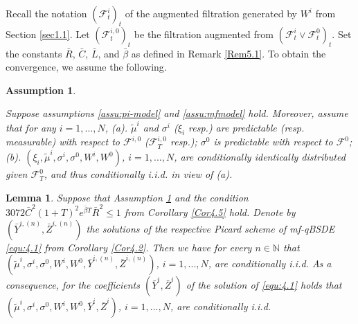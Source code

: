 \documentclass[10pt,a4paper]{article}
\newcommand{\MF}{{\mathcal{F}}}
\newcommand{\bL}{\bar{L}}
\newcommand{\bC}{\bar{C}}
\newcommand{\bR}{\bar{R}}
\theoremstyle{plain}
\newtheorem{Lemma}[Theorem]{Lemma}
\newtheorem{Assumption}[Theorem]{Assumption}
\theoremstyle{definition}
\numberwithin{equation}{section}
\begin{document}
 


Recall the notation $(\MF^i_t)_t$ of the augmented filtration generated by $W^i$ from Section \ref{sec1.1}. Let $(\MF^{i,0}_t)_t$ be the filtration augmented from $(\MF^i_t \vee \MF^0_t)_t$. Set the constants $\bR$, $\bC$, $\bL$, and $\bar\beta$ as defined in Remark \ref{Rem5.1}. To obtain the convergence, we assume the following.

\begin{Assumption}\label{assu:convergmf}

Suppose assumptions \ref{assu:pi-model} and \ref{assu:mfmodel} hold. Moreover, assume that for any $i=1,...,N$, 
(a). $\tilde \mu^i$ and $\sigma^i$ ($\xi_i $ resp.) are predictable (resp. measurable) with respect to $\MF^{i,0}$ ($\MF^{i,0}_T$ resp.); $\sigma^0$ is predictable with respect to $\MF^{0}$; \\
(b). $(\xi_i, \tilde \mu^i, \sigma^i, \sigma^0, W^i, W^0)$, $i=1,...,N$, are conditionally identically distributed given $\mathcal{F}_{T}^{0}$, and thus conditionally i.i.d. in view of (a).

\end{Assumption}


\begin{Lemma}\label{lem:ciid}
 Suppose that Assumption \ref{assu:convergmf} and the condition $
3072 \bC^{2}(1+T)^{2}e^{\bar{\beta} T} \bR^{2} \leq 1
$ from  Corollary \ref{Cor4.5} 
hold. Denote by $(\bar{Y}^{i,(n)},\bar{Z}^{i,(n)})$ the solutions of the respective Picard scheme of mf-qBSDE \eqref{equ:4.1} from Corollary \ref{Cor4.2}. Then we have for every $n \in \mathbb{N}$ that $(\tilde \mu^i, \sigma^i, \sigma^0, {W}^i,W^0, \bar{Y}^{i,(n)},\bar{Z}^{i,(n)})$, $i=1,...,N$, are conditionally i.i.d. As a consequence, for the coefficients $(\bar{Y}^{i},\bar{Z}^{i})$ of the solution of \eqref{equ:4.1} holds that $(\tilde \mu^i, \sigma^i, \sigma^0, {W}^i,W^0, \bar{Y}^{i},\bar{Z}^{i})$, $i=1,...,N$, are conditionally i.i.d.
\end{Lemma}
\end{document}
